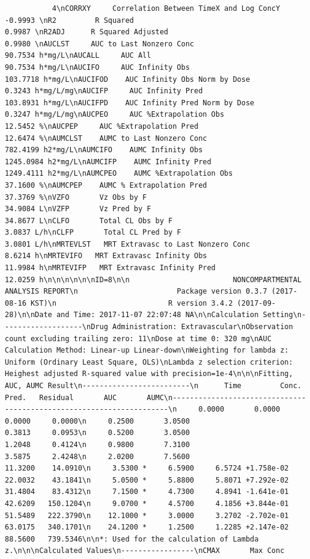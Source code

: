 \documentclass[12pt,]{krantz}
\theoremstyle{definition}
\theoremstyle{definition}
\theoremstyle{definition}
\theoremstyle{remark}
\begin{document}
\begin{verbatim}
           4\nCORRXY     Correlation Between TimeX and Log ConcY        -0.9993 \nR2         R Squared                                       0.9987 \nR2ADJ      R Squared Adjusted                              0.9980 \nAUCLST     AUC to Last Nonzero Conc                       90.7534 h*mg/L\nAUCALL     AUC All                                        90.7534 h*mg/L\nAUCIFO     AUC Infinity Obs                              103.7718 h*mg/L\nAUCIFOD    AUC Infinity Obs Norm by Dose                   0.3243 h*mg/L/mg\nAUCIFP     AUC Infinity Pred                             103.8931 h*mg/L\nAUCIFPD    AUC Infinity Pred Norm by Dose                  0.3247 h*mg/L/mg\nAUCPEO     AUC %Extrapolation Obs                         12.5452 %\nAUCPEP     AUC %Extrapolation Pred                        12.6474 %\nAUMCLST    AUMC to Last Nonzero Conc                     782.4199 h2*mg/L\nAUMCIFO    AUMC Infinity Obs                            1245.0984 h2*mg/L\nAUMCIFP    AUMC Infinity Pred                           1249.4111 h2*mg/L\nAUMCPEO    AUMC %Extrapolation Obs                        37.1600 %\nAUMCPEP    AUMC % Extrapolation Pred                      37.3769 %\nVZFO       Vz Obs by F                                    34.9084 L\nVZFP       Vz Pred by F                                   34.8677 L\nCLFO       Total CL Obs by F                               3.0837 L/h\nCLFP       Total CL Pred by F                              3.0801 L/h\nMRTEVLST   MRT Extravasc to Last Nonzero Conc              8.6214 h\nMRTEVIFO   MRT Extravasc Infinity Obs                     11.9984 h\nMRTEVIFP   MRT Extravasc Infinity Pred                    12.0259 h\n\n\n\n\n\nID=8\n\n                        NONCOMPARTMENTAL ANALYSIS REPORT\n                       Package version 0.3.7 (2017-08-16 KST)\n                          R version 3.4.2 (2017-09-28)\n\nDate and Time: 2017-11-07 22:07:48 NA\n\nCalculation Setting\n-------------------\nDrug Administration: Extravascular\nObservation count excluding trailing zero: 11\nDose at time 0: 320 mg\nAUC Calculation Method: Linear-up Linear-down\nWeighting for lambda z: Uniform (Ordinary Least Square, OLS)\nLambda z selection criterion: Heighest adjusted R-squared value with precision=1e-4\n\n\nFitting, AUC, AUMC Result\n-------------------------\n      Time         Conc.      Pred.   Residual       AUC       AUMC\n---------------------------------------------------------------------\n     0.0000       0.0000                           0.0000     0.0000\n     0.2500       3.0500                           0.3813     0.0953\n     0.5200       3.0500                           1.2048     0.4124\n     0.9800       7.3100                           3.5875     2.4248\n     2.0200       7.5600                          11.3200    14.0910\n     3.5300 *     6.5900     6.5724 +1.758e-02    22.0032    43.1841\n     5.0500 *     5.8800     5.8071 +7.292e-02    31.4804    83.4312\n     7.1500 *     4.7300     4.8941 -1.641e-01    42.6209   150.1204\n     9.0700 *     4.5700     4.1856 +3.844e-01    51.5489   222.3790\n    12.1000 *     3.0000     3.2702 -2.702e-01    63.0175   340.1701\n    24.1200 *     1.2500     1.2285 +2.147e-02    88.5600   739.5346\n\n*: Used for the calculation of Lambda z.\n\n\nCalculated Values\n-----------------\nCMAX       Max Conc         
\end{verbatim}
\end{document}
